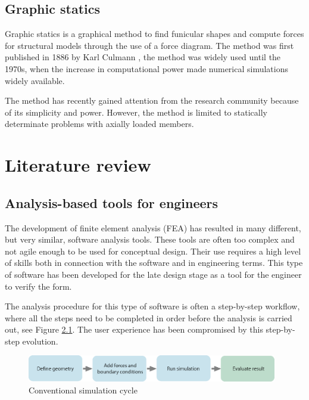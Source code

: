 \section{Graphic statics}
Graphic statics is a graphical method to find funicular shapes and compute forces for structural models through the use of a force diagram. The method was first published in 1886 by Karl Culmann \cite{Culmann1866}, the method was widely used until the 1970s, when the increase in computational power made numerical simulations widely available. 

The method has recently gained attention from the research community \cite{Todisco2015}\cite{Block}\cite{Fivet2013} because of its simplicity and power. However, the method is limited to statically determinate problems with axially loaded members. 



\chapter{Literature review}
\label{ch:Literature review}
\section{Analysis-based tools for engineers}
The development of finite element analysis (FEA) has resulted in many different, but very similar, software analysis tools. These tools are often too complex and not agile enough to be used for conceptual design. Their use requires a high level of skills both in connection with the software and in engineering terms. This type of software has been developed for the late design stage as a tool for the engineer to verify the form. 

 The analysis procedure for this type of software is often a step-by-step workflow, where all the steps need to be completed in order before the analysis is carried out, see Figure \ref{fig:conventional-cycle}. The user experience has been compromised by this step-by-step evolution.

\begin{figure}
  \includegraphics[width=310pt]{graphics/conventional-cycle.eps}
  \caption{Conventional simulation cycle}
  \label{fig:conventional-cycle}
\end{figure}

